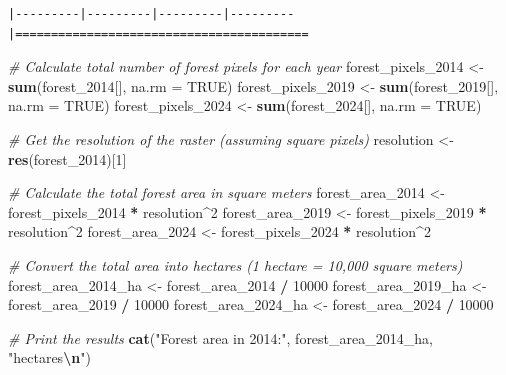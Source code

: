 \documentclass[
]{article}
\newenvironment{Shaded}{\begin{snugshade}}{\end{snugshade}}
\newcommand{\AttributeTok}[1]{\textcolor[rgb]{0.13,0.29,0.53}{#1}}
\newcommand{\CommentTok}[1]{\textcolor[rgb]{0.56,0.35,0.01}{\textit{#1}}}
\newcommand{\ConstantTok}[1]{\textcolor[rgb]{0.56,0.35,0.01}{#1}}
\newcommand{\DecValTok}[1]{\textcolor[rgb]{0.00,0.00,0.81}{#1}}
\newcommand{\FunctionTok}[1]{\textcolor[rgb]{0.13,0.29,0.53}{\textbf{#1}}}
\newcommand{\NormalTok}[1]{#1}
\newcommand{\OtherTok}[1]{\textcolor[rgb]{0.56,0.35,0.01}{#1}}
\newcommand{\SpecialCharTok}[1]{\textcolor[rgb]{0.81,0.36,0.00}{\textbf{#1}}}
\newcommand{\StringTok}[1]{\textcolor[rgb]{0.31,0.60,0.02}{#1}}
\begin{document}
\begin{verbatim}
|---------|---------|---------|---------|=========================================                                          
\end{verbatim}

\begin{Shaded}
\begin{Highlighting}[]
\CommentTok{\# Calculate total number of forest pixels for each year}
\NormalTok{forest\_pixels\_2014 }\OtherTok{\textless{}{-}} \FunctionTok{sum}\NormalTok{(forest\_2014[], }\AttributeTok{na.rm =} \ConstantTok{TRUE}\NormalTok{)  }
\NormalTok{forest\_pixels\_2019 }\OtherTok{\textless{}{-}} \FunctionTok{sum}\NormalTok{(forest\_2019[], }\AttributeTok{na.rm =} \ConstantTok{TRUE}\NormalTok{)  }
\NormalTok{forest\_pixels\_2024 }\OtherTok{\textless{}{-}} \FunctionTok{sum}\NormalTok{(forest\_2024[], }\AttributeTok{na.rm =} \ConstantTok{TRUE}\NormalTok{)  }

\CommentTok{\# Get the resolution of the raster (assuming square pixels)}
\NormalTok{resolution }\OtherTok{\textless{}{-}} \FunctionTok{res}\NormalTok{(forest\_2014)[}\DecValTok{1}\NormalTok{]}

\CommentTok{\# Calculate the total forest area in square meters}
\NormalTok{forest\_area\_2014 }\OtherTok{\textless{}{-}}\NormalTok{ forest\_pixels\_2014 }\SpecialCharTok{*}\NormalTok{ resolution}\SpecialCharTok{\^{}}\DecValTok{2}
\NormalTok{forest\_area\_2019 }\OtherTok{\textless{}{-}}\NormalTok{ forest\_pixels\_2019 }\SpecialCharTok{*}\NormalTok{ resolution}\SpecialCharTok{\^{}}\DecValTok{2}
\NormalTok{forest\_area\_2024 }\OtherTok{\textless{}{-}}\NormalTok{ forest\_pixels\_2024 }\SpecialCharTok{*}\NormalTok{ resolution}\SpecialCharTok{\^{}}\DecValTok{2}

\CommentTok{\# Convert the total area into hectares (1 hectare = 10,000 square meters)}
\NormalTok{forest\_area\_2014\_ha }\OtherTok{\textless{}{-}}\NormalTok{ forest\_area\_2014 }\SpecialCharTok{/} \DecValTok{10000}
\NormalTok{forest\_area\_2019\_ha }\OtherTok{\textless{}{-}}\NormalTok{ forest\_area\_2019 }\SpecialCharTok{/} \DecValTok{10000}
\NormalTok{forest\_area\_2024\_ha }\OtherTok{\textless{}{-}}\NormalTok{ forest\_area\_2024 }\SpecialCharTok{/} \DecValTok{10000}

\CommentTok{\# Print the results}
\FunctionTok{cat}\NormalTok{(}\StringTok{"Forest area in 2014:"}\NormalTok{, forest\_area\_2014\_ha, }\StringTok{"hectares}\SpecialCharTok{\textbackslash{}n}\StringTok{"}\NormalTok{)}
\end{Highlighting}
\end{Shaded}
\end{document}
